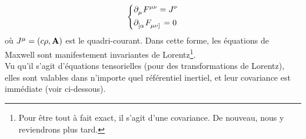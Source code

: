\begin{align}
    \begin{dcases}
        \pd\indices{_\mu} F\indices{^\mu^\nu} = J\indices{^\nu} \\
        \partial\indices{_[ _\alpha} F\indices{_\mu_\nu _]} = 0
    \end{dcases}
\end{align}
où $J^\mu = (c \rho,\bm{\mathrm{A}})$ est le quadri-courant. Dans cette forme, les équations de Maxwell sont manifestement invariantes de Lorentz\footnote{Pour être tout à fait exact, il s'agit d'une covariance. De nouveau, nous y reviendrons plus tard.}.
\\
Vu qu'il s'agit d'équations tensorielles (pour des transformations de Lorentz), elles sont valables dans n'importe quel référentiel inertiel, et leur covariance est immédiate (voir ci-dessous).
